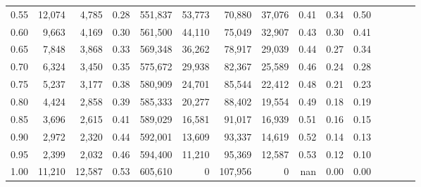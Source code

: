 \begin{tabular}{rrrcrrrrrrrrrrr}
0.55 &  12,074 &   4,785 &                                       0.28 &  551,837 &   53,773 &   70,880 &   37,076 &  0.41 &  0.34 &                         0.50 \\
0.60 &   9,663 &   4,169 &                                       0.30 &  561,500 &   44,110 &   75,049 &   32,907 &  0.43 &  0.30 &                         0.41 \\
0.65 &   7,848 &   3,868 &                                       0.33 &  569,348 &   36,262 &   78,917 &   29,039 &  0.44 &  0.27 &                         0.34 \\
0.70 &   6,324 &   3,450 &                                       0.35 &  575,672 &   29,938 &   82,367 &   25,589 &  0.46 &  0.24 &                         0.28 \\
0.75 &   5,237 &   3,177 &                                       0.38 &  580,909 &   24,701 &   85,544 &   22,412 &  0.48 &  0.21 &                         0.23 \\
0.80 &   4,424 &   2,858 &                                       0.39 &  585,333 &   20,277 &   88,402 &   19,554 &  0.49 &  0.18 &                         0.19 \\
0.85 &   3,696 &   2,615 &                                       0.41 &  589,029 &   16,581 &   91,017 &   16,939 &  0.51 &  0.16 &                         0.15 \\
0.90 &   2,972 &   2,320 &                                       0.44 &  592,001 &   13,609 &   93,337 &   14,619 &  0.52 &  0.14 &                         0.13 \\
0.95 &   2,399 &   2,032 &                                       0.46 &  594,400 &   11,210 &   95,369 &   12,587 &  0.53 &  0.12 &                         0.10 \\
1.00 &  11,210 &  12,587 &                                       0.53 &  605,610 &        0 &  107,956 &        0 &   nan &  0.00 &                         0.00 \\
\bottomrule
\end{tabular}
